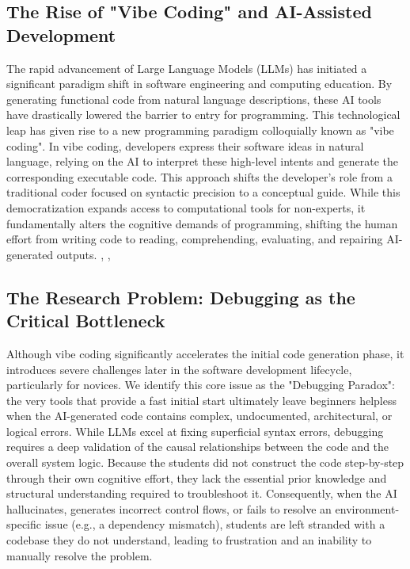 \documentclass[../main.tex]{subfiles}
\begin{document}
\subsection{The Rise of "Vibe Coding" and AI-Assisted Development}

The rapid advancement of Large Language Models (LLMs) has initiated a significant paradigm shift in software engineering and computing education.
By generating functional code from natural language descriptions, these AI tools have drastically lowered the barrier to entry for programming.
This technological leap has given rise to a new programming paradigm colloquially known as "vibe coding". 
In vibe coding, developers express their software ideas in natural language, relying on the AI to interpret these high-level intents and generate the corresponding executable code.
This approach shifts the developer's role from a traditional coder focused on syntactic precision to a conceptual guide.
While this democratization expands access to computational tools for non-experts, 
it fundamentally alters the cognitive demands of programming, shifting the human effort from writing code to reading, comprehending, evaluating, and repairing AI-generated outputs.
\cite{fortes2025vibe}, \cite{kazemitabaar2023studying}, \cite{lau2023from} 

\subsection{The Research Problem: Debugging as the Critical Bottleneck}

Although vibe coding significantly accelerates the initial code generation phase, it introduces severe challenges later in the software development lifecycle, particularly for novices.
We identify this core issue as the "Debugging Paradox": the very tools that provide a fast initial start ultimately leave beginners helpless when the AI-generated code contains complex, undocumented, architectural, or logical errors.
While LLMs excel at fixing superficial syntax errors, debugging requires a deep validation of the causal relationships between the code and the overall system logic.
Because the students did not construct the code step-by-step through their own cognitive effort, they lack the essential prior knowledge and structural understanding required to troubleshoot it.
Consequently, when the AI hallucinates, generates incorrect control flows, or fails to resolve an environment-specific issue (e.g., a dependency mismatch), students are left stranded with a codebase they do not understand, leading to frustration and an inability to manually resolve the problem.
\cite{prather2024widening}
\end{document}

